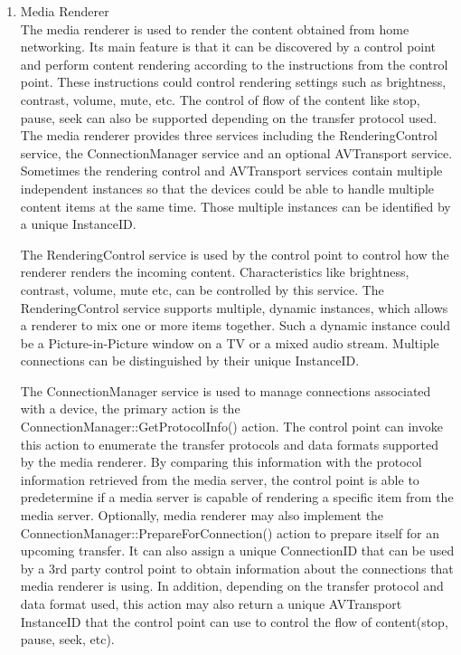 \begin{enumerate}
\item Media Renderer \\ 
The media renderer is used to render the content obtained from home 
networking. Its main feature is that it can be discovered by a control point and perform content rendering according to the instructions from the control point. These instructions could control rendering settings such as brightness, contrast, volume, mute, etc. The control of flow of the content like stop, pause, seek can also be supported depending on the transfer protocol used. The media 
renderer provides three services including the RenderingControl service, the ConnectionManager 
service and an optional AVTransport service. Sometimes the rendering control and 
AVTransport services contain multiple independent instances so that the devices 
could be able to handle multiple content items at the same time. Those multiple 
instances can be identified by a unique InstanceID. 

The RenderingControl service is used by the control point to control how the renderer 
renders the incoming content. Characteristics like brightness, contrast, 
volume, mute etc, can be controlled by this service. The RenderingControl service 
supports multiple, dynamic instances, which allows a renderer to mix one or 
more items together. Such a dynamic instance could be a Picture-in-Picture window on a TV or a mixed audio stream. Multiple connections can be distinguished by their unique InstanceID. 

The ConnectionManager service is used to manage connections associated with a 
device, the primary action is the ConnectionManager::GetProtocolInfo() action. 
The control point can invoke this action to enumerate the transfer protocols and 
data formats supported by the media renderer. By comparing this information with 
the protocol information retrieved from the media server, the control point is able to 
predetermine if a media server is capable of rendering a specific item from 
the media server. Optionally, media renderer may also implement the
ConnectionManager::PrepareForConnection() action to prepare itself for an 
upcoming transfer. It can also assign a unique ConnectionID that can be used by 
a 3rd party control point to obtain information about the connections that media 
renderer is using. In addition, depending on the transfer protocol and data 
format used, this action may also return a unique AVTransport InstanceID that the control 
point can use to control the flow of content(stop, pause, seek, etc). 


\end{enumerate}
